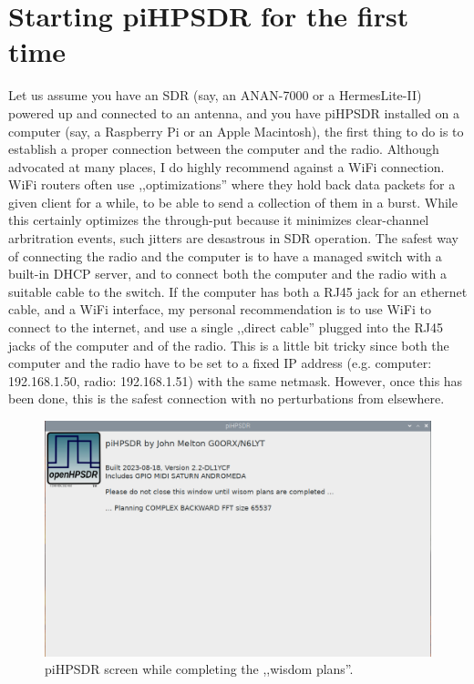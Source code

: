 \documentclass[12pt]{book}
\begin{document}
\chapter{Starting piHPSDR for the first time}
Let us assume you have an SDR (say, an ANAN-7000 or a HermesLite-II) powered up and connected to an antenna,
and you have piHPSDR installed on a computer (say, a Raspberry Pi or an Apple Macintosh), the first thing to
do is to establish a proper connection between the computer and the radio. Although advocated at many places,
I do highly recommend against a WiFi connection. WiFi routers often use ,,optimizations'' where they hold
back data packets for a given client for a while, to be able to send a collection of them in a burst. While
this certainly optimizes the through-put because it minimizes clear-channel arbritration events, such jitters
are desastrous in SDR operation. The safest way of connecting the radio and the computer is to have a
managed switch with a built-in DHCP server, and to connect both the computer and the radio with a suitable
cable to the switch. If the computer has both a RJ45 jack for an ethernet cable, and a WiFi interface, my
personal recommendation is to use WiFi to connect to the internet, and use a single ,,direct cable'' plugged
into the RJ45 jacks of the computer and of the radio. This is a little bit tricky since both the computer
and the radio have to be set to a fixed IP address (e.g. computer: 192.168.1.50, radio: 192.168.1.51) with
the same netmask. However, once this has been done, this is the safest connection with no perturbations from
elsewhere.

\begin{figure}
\center
\includegraphics[width=12cm]{Planning.png}
\caption{piHPSDR screen while completing the ,,wisdom plans''.}
\label{fig:Planning}
\end{figure}
\end{document}
